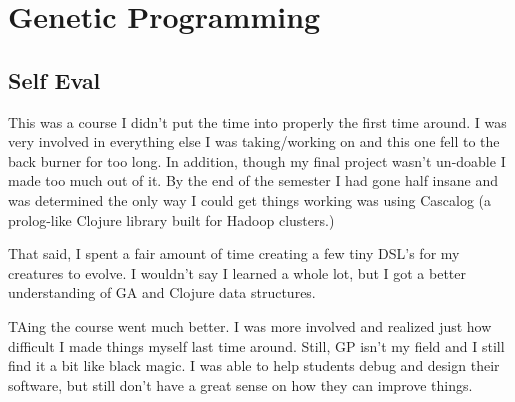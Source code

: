 \section{Genetic Programming}

\begin{meta}
\end{meta}

\subsection*{Self Eval}
This was a course I didn't put the time into properly the first time
around. I was very involved in everything else I was taking/working on
and this one fell to the back burner for too long. In addition, though
my final project wasn't un-doable I made too much out of it. By the end
of the semester I had gone half insane and was determined the only way
I could get things working was using Cascalog (a prolog-like Clojure
library built for Hadoop clusters.)

That said, I spent a fair amount of time creating a few tiny DSL's for
my creatures to evolve. I wouldn't say I learned a whole lot, but I got
a better understanding of GA and Clojure data structures.

TAing the course went much better. I was more involved and realized just
how difficult I made things myself last time around. Still, GP isn't my
field and I still find it a bit like black magic. I was able to help
students debug and design their software, but still don't have a great
sense on how they can improve things.

\vspace{0.5in}
